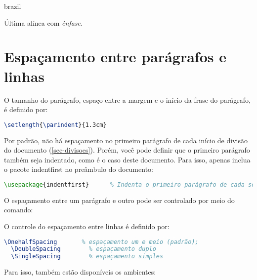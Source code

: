\begin{otherlanguage*}{brazil}
\begin{alineas}
  \item Última alínea com \emph{ênfase}.

\end{alineas}

\section{Espaçamento entre parágrafos e linhas}

O tamanho do parágrafo, espaço entre a margem
e o início da frase do parágrafo, é definido por:

\begin{lstlisting}[language=tex]
   \setlength{\parindent}{1.3cm}
\end{lstlisting}

Por padrão, não há espaçamento no
primeiro parágrafo de cada início de divisão do documento
(\autoref{sec-divisoes}). Porém, você pode definir que o primeiro parágrafo
também seja indentado, como é o caso deste documento. Para isso, apenas inclua o
pacote \textsf{indentfirst} no preâmbulo do documento:

\begin{lstlisting}[language=tex]
   \usepackage{indentfirst}      % Indenta o primeiro parágrafo de cada seção.
\end{lstlisting}

O espaçamento entre um parágrafo e outro
pode ser controlado por meio do comando:

\begin{verbnobox}[\small]
  \setlength{\parskip}{0.2cm}  %
\end{verbnobox}

O controle do espaçamento entre linhas é
definido por:

\begin{lstlisting}[language=tex]
  \OnehalfSpacing       % espaçamento um e meio (padrão);
  \DoubleSpacing        % espaçamento duplo
  \SingleSpacing        % espaçamento simples
\end{lstlisting}

Para isso, também estão disponíveis os ambientes:


\end{otherlanguage*}
